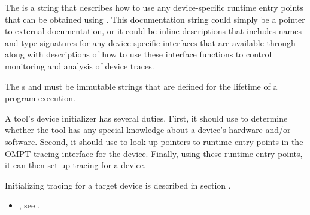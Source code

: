 The \callbackarg{}  is a string that describes
how to use any device-specific runtime
entry points that can be obtained using . This
documentation string could simply be a pointer to external
documentation, or it could be inline descriptions 
that includes names and type signatures for any
device-specific interfaces that are available through 
along with descriptions of how to use these interface functions to
control monitoring and analysis of device traces.

\constraints
The \callbackarg{}s  and  must be
immutable strings that are defined for the lifetime of a program
execution.

\effect

A tool's device initializer has several duties.  First, it should use
 to determine whether the tool has any special knowledge
about a device's hardware and/or software.  Second, it should use
 to look up pointers to runtime entry points in the OMPT tracing
interface for the device.  Finally, using these runtime entry points, it can
then set up tracing for a device.

Initializing tracing for a target device is described in section
. 

\crossreferences
\begin{itemize}
\item {}, see
  .
\end{itemize}

